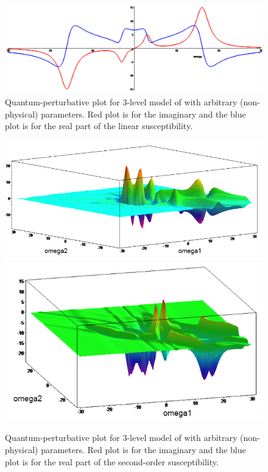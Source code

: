 \documentclass[12pt,twoside,a4paper]{article}
\numberwithin{equation}{subsection}
\numberwithin{figure}{subsection}
\begin{document}
\begin{figure} 
  \includegraphics[width=150mm]{img/qp_plot.png}
  \caption{Quantum-perturbative plot for 3-level model of with arbitrary (non-physical) parameters. Red plot is for the imaginary
  and the blue plot is for the real part of the linear susceptibility.
  \label{fig:qp_plot}}
\end{figure}
\begin{figure} 
  \includegraphics[width=150mm]{img/qp_3da.png} \\
  \includegraphics[width=150mm]{img/qp_3db.png}
  \caption{Quantum-perturbative plot for 3-level model of with arbitrary (non-physical) parameters. Red plot is for the imaginary
  and the blue plot is for the real part of the second-order susceptibility.
  \label{fig:qp_3d}}
\end{figure}
   
\end{document}
